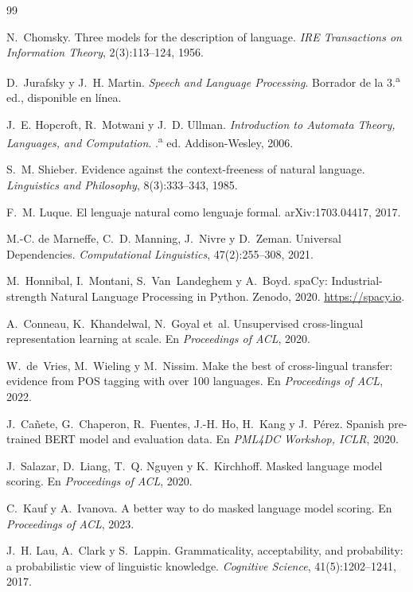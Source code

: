\begin{thebibliography}{99}

N.~Chomsky.
\newblock Three models for the description of language.
\newblock \emph{IRE Transactions on Information Theory}, 2(3):113--124, 1956.

D.~Jurafsky y J.~H. Martin.
\newblock \emph{Speech and Language Processing}.
\newblock Borrador de la 3.\textsuperscript{a} ed., disponible en línea.

J.~E. Hopcroft, R.~Motwani y J.~D. Ullman.
\newblock \emph{Introduction to Automata Theory, Languages, and Computation}.
.\textsuperscript{a} ed. Addison-Wesley, 2006.

S.~M. Shieber.
\newblock Evidence against the context-freeness of natural language.
\newblock \emph{Linguistics and Philosophy}, 8(3):333--343, 1985.

F.~M. Luque.
\newblock El lenguaje natural como lenguaje formal.
\newblock arXiv:1703.04417, 2017.

M.-C. de Marneffe, C.~D. Manning, J.~Nivre y D.~Zeman.
\newblock Universal Dependencies.
\newblock \emph{Computational Linguistics}, 47(2):255--308, 2021.

M.~Honnibal, I.~Montani, S.~Van~Landeghem y A.~Boyd.
\newblock spaCy: Industrial-strength Natural Language Processing in Python.
\newblock Zenodo, 2020. \url{https://spacy.io}.

A.~Conneau, K.~Khandelwal, N.~Goyal et~al.
\newblock Unsupervised cross-lingual representation learning at scale.
\newblock En \emph{Proceedings of ACL}, 2020.

W.~de~Vries, M.~Wieling y M.~Nissim.
\newblock Make the best of cross-lingual transfer: evidence from POS tagging with over 100
  languages.
\newblock En \emph{Proceedings of ACL}, 2022.

J.~Cañete, G.~Chaperon, R.~Fuentes, J.-H. Ho, H.~Kang y J.~Pérez.
\newblock Spanish pre-trained BERT model and evaluation data.
\newblock En \emph{PML4DC Workshop, ICLR}, 2020.

J.~Salazar, D.~Liang, T.~Q. Nguyen y K.~Kirchhoff.
\newblock Masked language model scoring.
\newblock En \emph{Proceedings of ACL}, 2020.

C.~Kauf y A.~Ivanova.
\newblock A better way to do masked language model scoring.
\newblock En \emph{Proceedings of ACL}, 2023.

J.~H. Lau, A.~Clark y S.~Lappin.
\newblock Grammaticality, acceptability, and probability: a probabilistic view of linguistic
  knowledge.
\newblock \emph{Cognitive Science}, 41(5):1202--1241, 2017.

\end{thebibliography}
